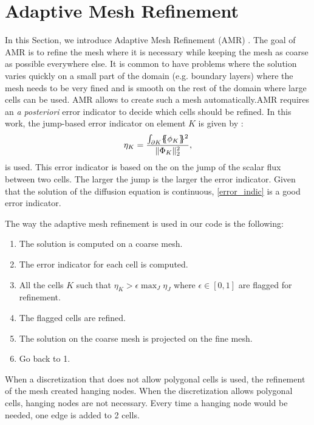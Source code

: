 \section{Adaptive Mesh Refinement} \label{sec_amr}
In this Section, we introduce Adaptive Mesh Refinement (AMR)
\cite{Jessee1998,Wang2010a,Ragusa2010}. The goal of AMR is to refine the mesh
where it is necessary while keeping the mesh as coarse as possible everywhere
else. It is common to have problems where the solution varies quickly on a
small part of the domain (e.g. boundary layers) where the mesh needs to be
very fined and is smooth on the rest of the domain where large cells can be
used. AMR allows to create such a mesh automatically.AMR requires an \emph{a
posteriori} error indicator to decide which cells should be refined. In this
work, the jump-based error indicator on element $K$ is given by \cite{Wang2010a}:
\begin{equation}
  \eta_K = \frac{\int_{\partial K} \{\!\!\{\phi_K\}\!\!\}^2}{\|\Phi_K\|_2^2},
  \label{error_indic}
\end{equation}  
is used. This error indicator is based on the on the jump of the scalar flux between
two cells. The larger the jump is the larger the error indicator. Given that
the solution of the diffusion equation is continuous, \cref{error_indic} is a
good error indicator. 

The way the adaptive mesh refinement is used in our code is the following:
\begin{enumerate}
  \item The solution is computed on a coarse mesh.
  \item The error indicator for each cell is computed.
  \item All the cells $K$ such that $\eta_K > \epsilon \max_{J} \eta_J$ where
    $\epsilon \in [0,1]$ are flagged for refinement.
  \item The flagged cells are refined.
  \item The solution on the coarse mesh is projected on the fine mesh.
  \item Go back to 1.
\end{enumerate}

When a discretization that does not allow polygonal cells is used, the
refinement of the mesh created hanging nodes. When the discretization allows
polygonal cells, hanging nodes are not necessary. Every time a hanging node
would be needed, one edge is added to 2 cells.
